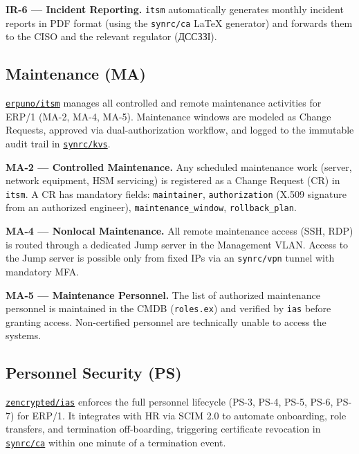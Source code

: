 \documentclass{article}
\begin{document}
\textbf{IR-6 --- Incident Reporting.}
\texttt{itsm} automatically generates monthly incident reports in PDF format (using the \texttt{synrc/ca} LaTeX generator) and forwards them to the CISO and the relevant regulator (\foreignlanguage{ukrainian}{ДССЗЗІ}).


\subsection{Maintenance (MA)}

\href{https://github.com/erpuno/itsm}{\texttt{erpuno/itsm}} manages all controlled and remote maintenance activities for ERP/1 (MA-2, MA-4, MA-5). Maintenance windows are modeled as Change Requests, approved via dual-authorization workflow, and logged to the immutable audit trail in \href{https://github.com/synrc/kvs}{\texttt{synrc/kvs}}.

\textbf{MA-2 --- Controlled Maintenance.}
Any scheduled maintenance work (server, network equipment, HSM servicing) is registered as a Change Request (CR) in \texttt{itsm}. A CR has mandatory fields: \texttt{maintainer}, \texttt{authorization} (X.509 signature from an authorized engineer), \texttt{maintenance\_window}, \texttt{rollback\_plan}.

\textbf{MA-4 --- Nonlocal Maintenance.}
All remote maintenance access (SSH, RDP) is routed through a dedicated Jump server in the Management VLAN. Access to the Jump server is possible only from fixed IPs via an \texttt{synrc/vpn} tunnel with mandatory MFA.

\textbf{MA-5 --- Maintenance Personnel.}
The list of authorized maintenance personnel is maintained in the CMDB (\texttt{roles.ex}) and verified by \texttt{ias} before granting access. Non-certified personnel are technically unable to access the systems.

\subsection{Personnel Security (PS)}

\href{https://github.com/zencrypted/ias}{\texttt{zencrypted/ias}} enforces the full personnel lifecycle (PS-3, PS-4, PS-5, PS-6, PS-7) for ERP/1. It integrates with HR via SCIM 2.0 to automate onboarding, role transfers, and termination off-boarding, triggering certificate revocation in \href{https://github.com/synrc/ca}{\texttt{synrc/ca}} within one minute of a termination event.
\end{document}
